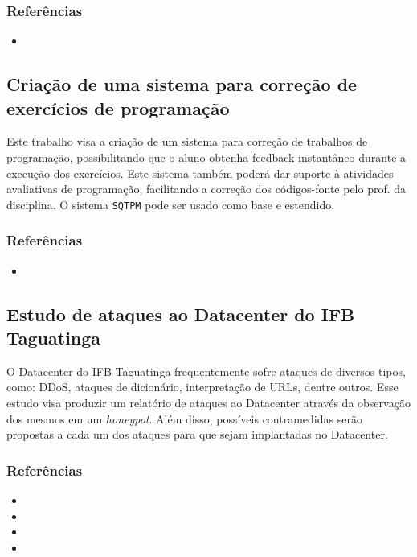\documentclass{article}
\newcommand*{\nsubsection}[1]{
    \subsection{#1}
}
\begin{document}
\subsubsection*{Referências}


\begin{itemize}
	\item {}
\end{itemize}


\nsubsection{Criação de uma sistema para correção de exercícios de programação}

Este trabalho visa a criação de um sistema para correção de trabalhos de programação, possibilitando que o aluno obtenha feedback instantâneo durante a execução dos exercícios. Este sistema também poderá dar suporte à atividades avaliativas de programação, facilitando a correção dos códigos-fonte pelo prof. da disciplina. O sistema {\tt SQTPM} pode ser usado como base e estendido.

\subsubsection*{Referências}


\begin{itemize}
	\item {}
\end{itemize}




\nsubsection{Estudo de ataques ao Datacenter do IFB Taguatinga}

O Datacenter do IFB Taguatinga frequentemente sofre ataques de diversos tipos, como: DDoS, ataques de dicionário, interpretação de URLs, dentre outros.
Esse estudo visa produzir um relatório de ataques ao Datacenter através da observação dos mesmos em um \textit{honeypot}. Além disso, possíveis contramedidas serão propostas a cada um dos ataques para que sejam implantadas no Datacenter.

\subsubsection*{Referências}

\begin{itemize}
	\item {}
	\item {}
	\item {}
	\item {}
\end{itemize}
\end{document}
